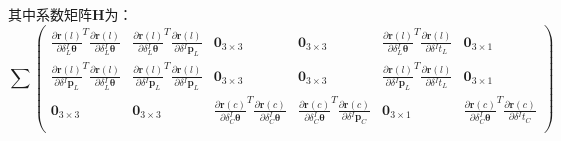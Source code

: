 其中系数矩阵$\boldsymbol{H}$为：
\begin{equation}
  \sum\begin{pmatrix}
    \frac{\partial \boldsymbol{r}(l)}{\partial \delta {^{I}_{L}\boldsymbol{\theta}}}^T
    \frac{\partial \boldsymbol{r}(l)}{\partial \delta {^{I}_{L}\boldsymbol{\theta}}} &
    \frac{\partial \boldsymbol{r}(l)}{\partial \delta {^{I}_{L}\boldsymbol{\theta}}}^T
    \frac{\partial \boldsymbol{r}(l)}{\partial \delta {^{I}\boldsymbol{p}_L}}        &
    \boldsymbol{0}_{3\times 3}                                                       &
    \boldsymbol{0}_{3\times 3}                                                       &
    \frac{\partial \boldsymbol{r}(l)}{\partial \delta {^{I}_{L}\boldsymbol{\theta}}}^T
    \frac{\partial \boldsymbol{r}(l)}{\partial \delta {^{I}t_{L}}}                   &
    \boldsymbol{0}_{3\times 1}                                                         \\
    \frac{\partial \boldsymbol{r}(l)}{\partial \delta {^{I}\boldsymbol{p}_L}}^T
    \frac{\partial \boldsymbol{r}(l)}{\partial \delta {^{I}_{L}\boldsymbol{\theta}}} &
    \frac{\partial \boldsymbol{r}(l)}{\partial \delta {^{I}\boldsymbol{p}_L}}^T
    \frac{\partial \boldsymbol{r}(l)}{\partial \delta {^{I}\boldsymbol{p}_L}}        &
    \boldsymbol{0}_{3\times 3}                                                       &
    \boldsymbol{0}_{3\times 3}                                                       &
    \frac{\partial \boldsymbol{r}(l)}{\partial \delta {^{I}\boldsymbol{p}_L}}^T
    \frac{\partial \boldsymbol{r}(l)}{\partial \delta {^{I}t_{L}}}                   &
    \boldsymbol{0}_{3\times 1}                                                         \\
    \boldsymbol{0}_{3\times 3}                                                       &
    \boldsymbol{0}_{3\times 3}                                                       &
    \frac{\partial \boldsymbol{r}(c)}{\partial \delta {^{I}_{C}\boldsymbol{\theta}}}^T
    \frac{\partial \boldsymbol{r}(c)}{\partial \delta {^{I}_{C}\boldsymbol{\theta}}} &
    \frac{\partial \boldsymbol{r}(c)}{\partial \delta {^{I}_{C}\boldsymbol{\theta}}}^T
    \frac{\partial \boldsymbol{r}(c)}{\partial \delta {^{I}\boldsymbol{p}_C}}        &
    \boldsymbol{0}_{3\times 1}                                                       &
    \frac{\partial \boldsymbol{r}(c)}{\partial \delta {^{I}_{C}\boldsymbol{\theta}}}^T
    \frac{\partial \boldsymbol{r}(c)}{\partial \delta {^{I}t_{C}}}                     \\

\end{pmatrix}
\end{equation}
